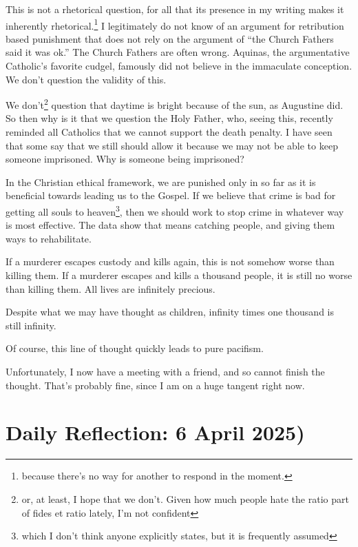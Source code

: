 \documentclass[12pt]{article}[titlepage]
\newcommand{\say}[1]{``#1''}
\renewcommand{\,}{\textsuperscript{,}}
\begin{document}
This is not a rhetorical question, for all that its presence in my writing makes it inherently rhetorical.\footnote{because there's no way for another to respond in the moment.}  
I legitimately do not know of an argument for retribution based punishment that does not rely on the argument of \say{the Church Fathers said it was ok.}  
The Church Fathers are often wrong.  
Aquinas, the argumentative Catholic's favorite cudgel, famously did not believe in the immaculate conception.  
We don't question the validity of this.

We don't\footnote{or, at least, I hope that we don't. Given how much people hate the ratio part of fides et ratio lately, I'm not confident} question that daytime is bright because of the sun, as Augustine did.  
So then why is it that we question the Holy Father, who, seeing this, recently reminded all Catholics that we cannot support the death penalty.  
I have seen that some say that we still should allow it because we may not be able to keep someone imprisoned.  
Why is someone being imprisoned?

In the Christian ethical framework, we are punished only in so far as it is beneficial towards leading us to the Gospel.  
If we believe that crime is bad for getting all souls to heaven\footnote{which I don't think anyone explicitly states, but it is frequently assumed}, then we should work to stop crime in whatever way is most effective.  
The data show that means catching people, and giving them ways to rehabilitate.

If a murderer escapes custody and kills again, this is not somehow worse than killing them.  
If a murderer escapes and kills a thousand people, it is still no worse than killing them.  
All lives are infinitely precious.

Despite what we may have thought as children, infinity times one thousand is still infinity.

Of course, this line of thought quickly leads to pure pacifism.

Unfortunately, I now have a meeting with a friend, and so cannot finish the thought.  
That's probably fine, since I am on a huge tangent right now.

\section{Daily Reflection: 6 April 2025)}
\end{document}

